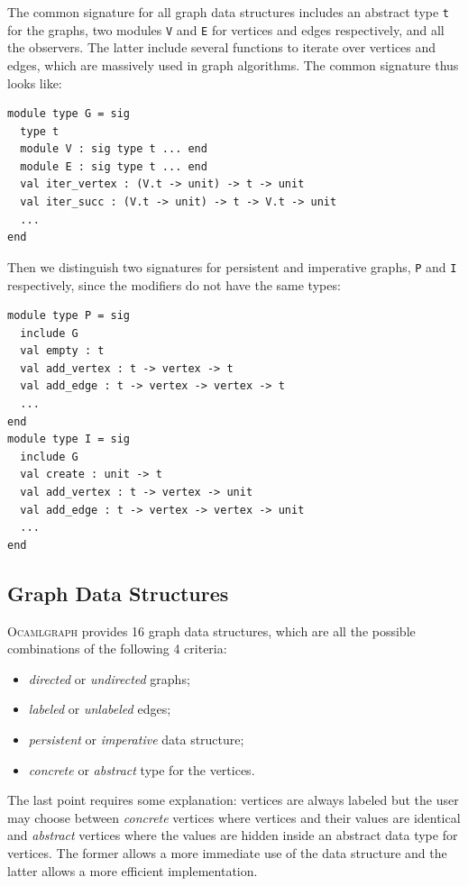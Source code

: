 \documentclass[]{tfp05symp}
\newcommand{\ocamlgraph}{\textsc{Ocamlgraph}\xspace}
\begin{document}
The common signature for all graph data structures includes an
abstract type \texttt{t} for the graphs, two modules \texttt{V} and
\texttt{E} for vertices and edges respectively, and all the
observers. The latter include several functions to iterate over
vertices and edges, which are massively used in graph algorithms. 
The common signature thus looks like:
\begin{verbatim}
module type G = sig
  type t
  module V : sig type t ... end
  module E : sig type t ... end
  val iter_vertex : (V.t -> unit) -> t -> unit
  val iter_succ : (V.t -> unit) -> t -> V.t -> unit
  ...
end
\end{verbatim}
Then we distinguish two signatures for persistent and imperative
graphs, \texttt{P} and \texttt{I} respectively, since the modifiers do
not have the same types:
\begin{verbatim}
module type P = sig
  include G
  val empty : t
  val add_vertex : t -> vertex -> t
  val add_edge : t -> vertex -> vertex -> t
  ...
end
module type I = sig
  include G
  val create : unit -> t
  val add_vertex : t -> vertex -> unit
  val add_edge : t -> vertex -> vertex -> unit
  ...
end
\end{verbatim}

\subsection{Graph Data Structures}\label{structuresdedonnees}

\ocamlgraph provides 16 graph data structures, which are all the
possible combinations of the following 4 criteria:
\begin{itemize}
\item \emph{directed} or \emph{undirected} graphs;
\item \emph{labeled} or \emph{unlabeled} edges;
\item \emph{persistent} or \emph{imperative} data structure;
\item \emph{concrete} or \emph{abstract} type for the vertices.
\end{itemize}
The last point requires some explanation: vertices are always labeled
but the user may choose between \emph{concrete} vertices where vertices and
their values are identical and \emph{abstract} vertices where the
values are hidden inside an abstract data type for vertices. The
former allows a more immediate use of the data structure and the
latter allows a more efficient implementation.
\end{document}
